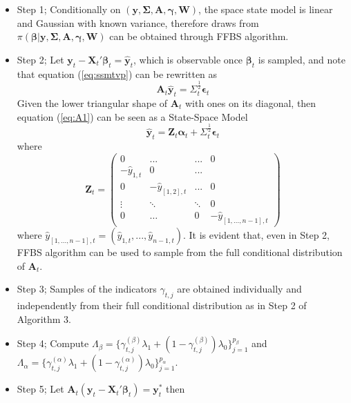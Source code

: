 \documentclass[
  12pt,
]{book}
\theoremstyle{break}
\theoremstyle{nonumberplain}
\begin{document}
\begin{itemize}
\item Step 1; Conditionally on $(\boldsymbol{y},\boldsymbol{\Sigma},\boldsymbol{A},\boldsymbol{\gamma},\boldsymbol{W})$, the space state model is linear and Gaussian with known variance, therefore draws from $\pi(\boldsymbol{\beta}|\boldsymbol{y},\boldsymbol{\Sigma},\boldsymbol{A},\boldsymbol{\gamma},\boldsymbol{W})$ can be obtained through FFBS algorithm.
\item Step 2; Let $\boldsymbol{y}_{t}-\boldsymbol{X}_{t}'\boldsymbol{\beta}_{t}=\hat{\boldsymbol{y}}_{t}$, which is observable once $\boldsymbol{\beta}_{t}$ is sampled, and note that equation (\ref{eq:ssmtvp}) can be rewritten as
\begin{equation}\label{eq:A1}
\boldsymbol{A}_{t}\hat{\boldsymbol{y}}_{t}=\Sigma^{\frac{1}{2}}_{t}\boldsymbol{\epsilon}_{t}
\end{equation}
Given the lower triangular shape of $\boldsymbol{A}_{t}$ with ones on its diagonal, then equation (\ref{eq:A1}) can be seen as a State-Space Model
\begin{equation}
\hat{\boldsymbol{y}}_{t}=\boldsymbol{Z}_{t}\boldsymbol{\alpha}_{t}+\Sigma^{\frac{1}{2}}_{t}\boldsymbol{\epsilon}_{t}
\end{equation}
where 
\[
\boldsymbol{Z}_{t} = \begin{pmatrix}
  0 & ... &  ... & 0 \\
  -\hat{y}_{1,t} & 0 & ... \\
  0 & -\hat{y}_{[1,2],t} & ... & 0 \\
  \vdots & \ddots & \ddots & 0\\
  0 & \dots &  0 & -\hat{y}_{[1,...,n-1],t}
  \end{pmatrix}
\]
where $\hat{y}_{[1,...,n-1],t}=(\hat{y}_{1,t},...,\hat{y}_{n-1,t})$. 
It is evident that, even in Step 2, FFBS algorithm can be used to sample from the full conditional distribution of $\boldsymbol{A}_{t}$.
\item Step 3; Samples of the indicators $\gamma_{t,j}$ are obtained individually and independently from their full conditional distribution as in Step 2 of Algorithm 3.
\item Step 4; Compute $\Lambda_{\beta}=\{\gamma_{t,j}^{(\beta)}\lambda_{1}+(1-\gamma_{t,j}^{(\beta)})\lambda_0\}_{j=1}^{p_{\beta}}$ and $\Lambda_{\alpha}=\{\gamma_{t,j}^{(\alpha)}\lambda_{1}+(1-\gamma_{t,j}^{(\alpha)})\lambda_0\}_{j=1}^{p_{\alpha}}$.
\item Step 5; Let $\boldsymbol{A}_{t}(\boldsymbol{y}_{t}-\boldsymbol{X}_{t}'\boldsymbol{\beta}_{t})=\boldsymbol{y}_{t}^{*}$ then 

\end{itemize}
\end{document}
